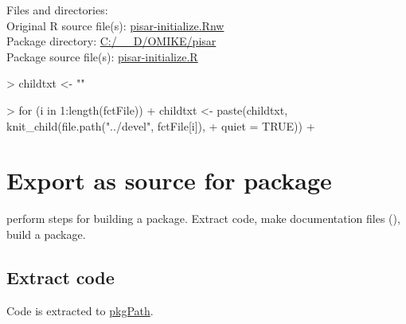 \documentclass[a4paper,12pt]{article}\usepackage[]{graphicx}\usepackage[]{color}
\begin{document}
Files and directories:\\[12pt]
Original R source file(s): \url{pisar-initialize.Rnw}\\
Package directory: \url{C:/__D/OMIKE/pisar}\\
Package source file(s): \url{pisar-initialize.R}

\clearpage
\begin{Schunk}
\begin{Sinput}
> childtxt <- ""
\end{Sinput}
\end{Schunk}
\begin{Schunk}
\begin{Sinput}
> for (i in 1:length(fctFile)) {
+     childtxt <- paste(childtxt, knit_child(file.path("../devel", fctFile[i]), 
+         quiet = TRUE))
+ }
\end{Sinput}
\end{Schunk}

\clearpage
\section{Export as source for package}

perform steps for building a package. Extract code, make documentation files (), build a package.

\subsection{Extract code}

Code is extracted to \url{pkgPath}.
\end{document}
